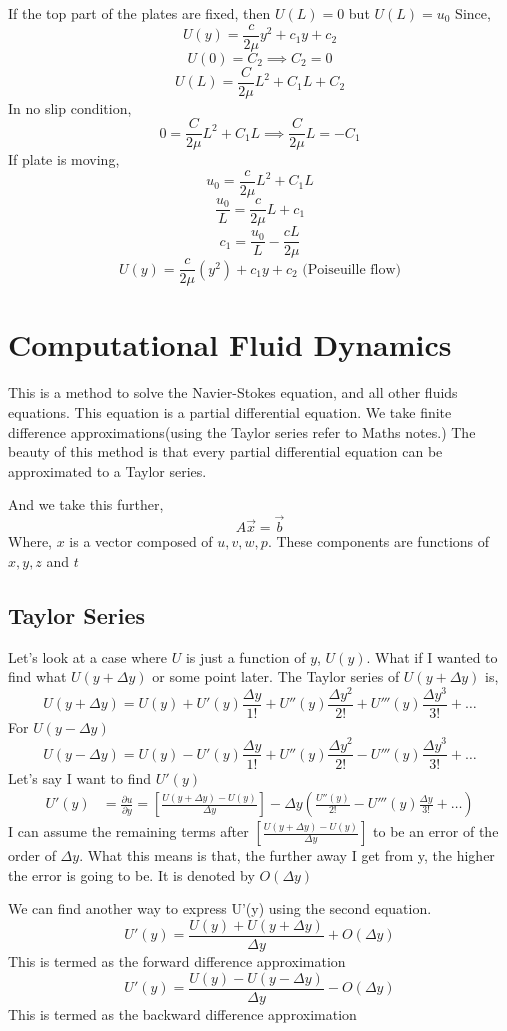 \documentclass{report}
\begin{document}
\begin{enumerate}
If the top part of the plates are fixed, then $U(L) = 0$ but $U(L) = u_0$
Since,
\[
  U(y) = \frac{c}{2\mu}y^2 + c_1 y + c_2
\]
\[
  U(0) = C_2 \implies C_2 = 0
\]
\[
  U(L) = \frac{C}{2\mu}L^2 + C_1 L + C_2
\]
In no slip condition,
\[
  0 = \frac{C}{2\mu}L^2 + C_1 L \implies \frac{C}{2\mu}L = -C_1
\]
If plate is moving, 
\[
  u_0 = \frac{c}{2\mu} L^2 + C_1 L
\]
\[
  \frac{u_0}{L} = \frac{c}{2\mu}L + c_1
\]
\[
  c_1 = \frac{u_0}{L} - \frac{cL}{2\mu}
\]
\[
  U(y) = \frac{c}{2\mu}(y^2) +  c_1 y + c_2 \text{ (Poiseuille flow)}
\]
\end{enumerate}

\section{Computational Fluid Dynamics}
This is a method to solve the Navier-Stokes equation, and all other fluids equations. This equation is a partial differential equation. We take finite difference approximations(using the Taylor series refer to Maths notes.) The beauty of this method is that every partial differential equation can be approximated to a Taylor series.

And we take this further,
\[
  A \vec{x} = \vec{b}
\]
Where, $x$ is a vector composed of $u,v,w,p$. These components are functions of $x,y,z$ and $t$
\subsection{Taylor Series}
Let's look at a case where $U$ is just a function of $y$, $U(y)$. What if I wanted to find what $U(y+\Delta y)$ or some point later. 
The Taylor series of $U(y+\Delta y)$ is,
\[
  U(y+\Delta y) = U(y) + U'(y)\frac{\Delta y}{1!} + U''(y)\frac{\Delta y^2}{2!} + U'''(y)\frac{\Delta y^3}{3!} + \dots
\]
For $U(y - \Delta y)$
\[
  U(y-\Delta y) = U(y) - U'(y)\frac{\Delta y}{1!} + U''(y)\frac{\Delta y^2}{2!} - U'''(y)\frac{\Delta y^3}{3!} + \dots
\]
Let's say I want to find $U'(y)$ 
\begin{align*}
  U'(y) &= \frac{\partial u}{\partial y} = [\frac{U(y+\Delta y) - U(y)}{\Delta y}] - \Delta y (\frac{U''(y)}{2!} - U'''(y)\frac{\Delta y}{3!} + \dots)
\end{align*}
I can assume the remaining terms after $[\frac{U(y+\Delta y) - U(y)}{\Delta y}] $ to be an error of the order of $\Delta y$. What this means is that, the further away I get from y, the higher the error is going to be. It is denoted by $O(\Delta y)$

We can find another way to express U'(y) using the second equation.
\[
  U'(y) = \frac{U(y) + U(y+\Delta y)}{\Delta y} + O(\Delta y)
\]
This is termed as the forward difference approximation
\[
  U'(y) = \frac{U(y) - U(y-\Delta y)}{\Delta y} - O(\Delta y)
\]
This is termed as the backward difference approximation
\end{document}
